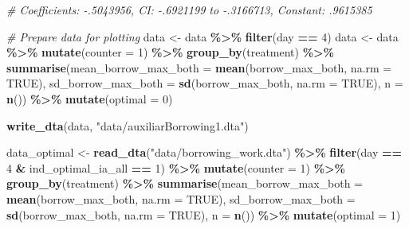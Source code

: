 \documentclass[
]{article}
\newenvironment{Shaded}{\begin{snugshade}}{\end{snugshade}}
\newcommand{\AttributeTok}[1]{\textcolor[rgb]{0.13,0.29,0.53}{#1}}
\newcommand{\CommentTok}[1]{\textcolor[rgb]{0.56,0.35,0.01}{\textit{#1}}}
\newcommand{\ConstantTok}[1]{\textcolor[rgb]{0.56,0.35,0.01}{#1}}
\newcommand{\DecValTok}[1]{\textcolor[rgb]{0.00,0.00,0.81}{#1}}
\newcommand{\FunctionTok}[1]{\textcolor[rgb]{0.13,0.29,0.53}{\textbf{#1}}}
\newcommand{\NormalTok}[1]{#1}
\newcommand{\OtherTok}[1]{\textcolor[rgb]{0.56,0.35,0.01}{#1}}
\newcommand{\SpecialCharTok}[1]{\textcolor[rgb]{0.81,0.36,0.00}{\textbf{#1}}}
\newcommand{\StringTok}[1]{\textcolor[rgb]{0.31,0.60,0.02}{#1}}
\begin{document}
\begin{Shaded}
\begin{Highlighting}[]
\CommentTok{\# Coefficients: {-}.5043956, CI: {-}.6921199 to {-}.3166713, Constant: .9615385}

\CommentTok{\# Prepare data for plotting}
\NormalTok{data }\OtherTok{\textless{}{-}}\NormalTok{ data }\SpecialCharTok{\%\textgreater{}\%} \FunctionTok{filter}\NormalTok{(day }\SpecialCharTok{==} \DecValTok{4}\NormalTok{)}
\NormalTok{data }\OtherTok{\textless{}{-}}\NormalTok{ data }\SpecialCharTok{\%\textgreater{}\%}
  \FunctionTok{mutate}\NormalTok{(}\AttributeTok{counter =} \DecValTok{1}\NormalTok{) }\SpecialCharTok{\%\textgreater{}\%}
  \FunctionTok{group\_by}\NormalTok{(treatment) }\SpecialCharTok{\%\textgreater{}\%}
  \FunctionTok{summarise}\NormalTok{(}\AttributeTok{mean\_borrow\_max\_both =} \FunctionTok{mean}\NormalTok{(borrow\_max\_both, }\AttributeTok{na.rm =} \ConstantTok{TRUE}\NormalTok{),}
            \AttributeTok{sd\_borrow\_max\_both =} \FunctionTok{sd}\NormalTok{(borrow\_max\_both, }\AttributeTok{na.rm =} \ConstantTok{TRUE}\NormalTok{),}
            \AttributeTok{n =} \FunctionTok{n}\NormalTok{()) }\SpecialCharTok{\%\textgreater{}\%}
  \FunctionTok{mutate}\NormalTok{(}\AttributeTok{optimal =} \DecValTok{0}\NormalTok{)}

\FunctionTok{write\_dta}\NormalTok{(data, }\StringTok{"data/auxiliarBorrowing1.dta"}\NormalTok{)}

\NormalTok{data\_optimal }\OtherTok{\textless{}{-}} \FunctionTok{read\_dta}\NormalTok{(}\StringTok{"data/borrowing\_work.dta"}\NormalTok{) }\SpecialCharTok{\%\textgreater{}\%}
  \FunctionTok{filter}\NormalTok{(day }\SpecialCharTok{==} \DecValTok{4} \SpecialCharTok{\&}\NormalTok{ ind\_optimal\_ia\_all }\SpecialCharTok{==} \DecValTok{1}\NormalTok{) }\SpecialCharTok{\%\textgreater{}\%}
  \FunctionTok{mutate}\NormalTok{(}\AttributeTok{counter =} \DecValTok{1}\NormalTok{) }\SpecialCharTok{\%\textgreater{}\%}
  \FunctionTok{group\_by}\NormalTok{(treatment) }\SpecialCharTok{\%\textgreater{}\%}
  \FunctionTok{summarise}\NormalTok{(}\AttributeTok{mean\_borrow\_max\_both =} \FunctionTok{mean}\NormalTok{(borrow\_max\_both, }\AttributeTok{na.rm =} \ConstantTok{TRUE}\NormalTok{),}
            \AttributeTok{sd\_borrow\_max\_both =} \FunctionTok{sd}\NormalTok{(borrow\_max\_both, }\AttributeTok{na.rm =} \ConstantTok{TRUE}\NormalTok{),}
            \AttributeTok{n =} \FunctionTok{n}\NormalTok{()) }\SpecialCharTok{\%\textgreater{}\%}
  \FunctionTok{mutate}\NormalTok{(}\AttributeTok{optimal =} \DecValTok{1}\NormalTok{)}


\end{Highlighting}
\end{Shaded}
\end{document}
